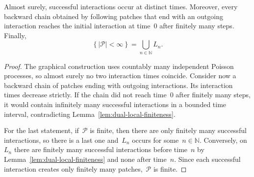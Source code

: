 \documentclass[EJP,preprint,NODS,nobera]{ejpecp}
\newcommand{\N}{\mathbb{N}}
\newcommand{\cb}[1]{\left\{#1\right\}}
\newcommand{\abs}[1]{\left|#1\right|}
\begin{document}
\begin{lemma}
\label{lem:patch-local-finiteness-consequences}
Almost surely, successful interactions occur at distinct times. Moreover, every
backward chain obtained by following patches that end with an outgoing
interaction reaches the initial interaction at time~$0$ after finitely many
steps. Finally,
\begin{equation}
\label{eq:finite-patch-family-last-interaction}
\cb{\abs{\mathcal P}<\infty}
=
\bigcup_{n\in\N}L_n.
\end{equation}
\end{lemma}

\begin{proof}
The graphical construction uses countably many independent Poisson processes,
so almost surely no two interaction times coincide. Consider now a backward
chain of patches ending with outgoing interactions. Its interaction times
decrease strictly. If the chain did not reach time~$0$ after finitely many
steps, it would contain infinitely many successful interactions in a bounded
time interval, contradicting Lemma~\ref{lem:dual-local-finiteness}.

For the last statement, if~$\mathcal P$ is finite, then there are only
finitely many successful interactions, so there is a last one and~$L_n$ occurs
for some~$n\in\N$. Conversely, on~$L_n$ there are finitely many successful
interactions before time~$n$ by Lemma~\ref{lem:dual-local-finiteness} and none
after time~$n$. Since each successful interaction creates only finitely many
patches,~$\mathcal P$ is finite.
\end{proof}
\end{document}
